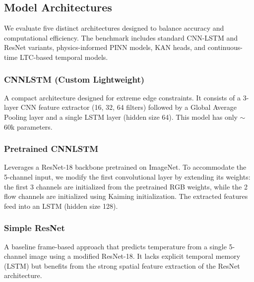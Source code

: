 

\subsection{Model Architectures}
We evaluate five distinct architectures designed to balance accuracy and computational efficiency.
The benchmark includes standard CNN-LSTM and ResNet variants, physics-informed PINN models, KAN heads, and continuous-time LTC-based temporal models.

\subsubsection{CNNLSTM (Custom Lightweight)}
A compact architecture designed for extreme edge constraints. It consists of a 3-layer CNN feature extractor (16, 32, 64 filters) followed by a Global Average Pooling layer and a single LSTM layer (hidden size 64). This model has only $\sim$60k parameters.

\subsubsection{Pretrained CNNLSTM}
Leverages a ResNet-18 \cite{he2016deep} backbone pretrained on ImageNet. To accommodate the 5-channel input, we modify the first convolutional layer by extending its weights: the first 3 channels are initialized from the pretrained RGB weights, while the 2 flow channels are initialized using Kaiming initialization. The extracted features feed into an LSTM (hidden size 128).

\subsubsection{Simple ResNet}
A baseline frame-based approach that predicts temperature from a single 5-channel image using a modified ResNet-18. It lacks explicit temporal memory (LSTM) but benefits from the strong spatial feature extraction of the ResNet architecture.

